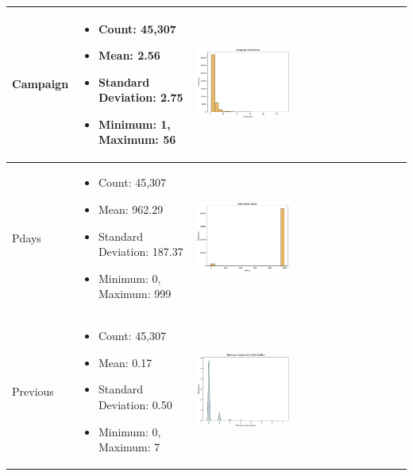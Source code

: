 \documentclass{article}
\begin{document}
\begin{longtable}{|p{}|p{}|p{}|}
    \hline
    Campaign & 
    \begin{itemize}
        \item Count: 45,307
        \item Mean: 2.56
        \item Standard Deviation: 2.75
        \item Minimum: 1, Maximum: 56
    \end{itemize} & 
    \includegraphics[width=0.45\textwidth]{data/bank_marketing/pic/Bank_Add_campaign.png} \\
    \hline
    Pdays & 
    \begin{itemize}
        \item Count: 45,307
        \item Mean: 962.29
        \item Standard Deviation: 187.37
        \item Minimum: 0, Maximum: 999
    \end{itemize} & 
    \includegraphics[width=0.45\textwidth]{data/bank_marketing/pic/Bank_Add_pdays.png} \\
    \hline
    Previous & 
    \begin{itemize}
        \item Count: 45,307
        \item Mean: 0.17
        \item Standard Deviation: 0.50
        \item Minimum: 0, Maximum: 7
    \end{itemize} & 
    \includegraphics[width=0.45\textwidth]{data/bank_marketing/pic/Bank_Add_Previous.png} \\

\end{longtable}
\end{document}
